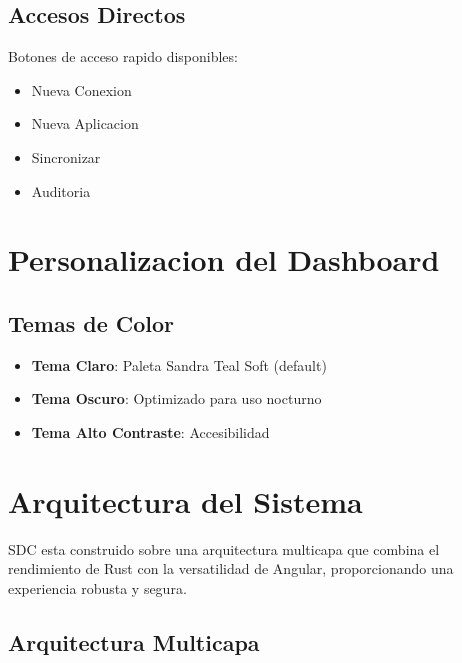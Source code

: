 \subsection{Accesos Directos}

Botones de acceso rapido disponibles:

\begin{itemize}[leftmargin=*]
    \item {\color{sandraGreen}} Nueva Conexion
    \item {\color{sandraGreen}} Nueva Aplicacion
    \item {\color{sandraGreen}} Sincronizar
    \item {\color{sandraGreen}} Auditoria
\end{itemize}

\section{Personalizacion del Dashboard}

\subsection{Temas de Color}

\begin{itemize}[leftmargin=*]
    \item \textbf{Tema Claro}: Paleta Sandra Teal Soft (default)
    \item \textbf{Tema Oscuro}: Optimizado para uso nocturno
    \item \textbf{Tema Alto Contraste}: Accesibilidad
\end{itemize}

\section{Arquitectura del Sistema}
\label{sec:arquitectura-sdc}

SDC esta construido sobre una arquitectura multicapa que combina el rendimiento de Rust con la versatilidad de Angular, proporcionando una experiencia robusta y segura.


\subsection{Arquitectura Multicapa}

